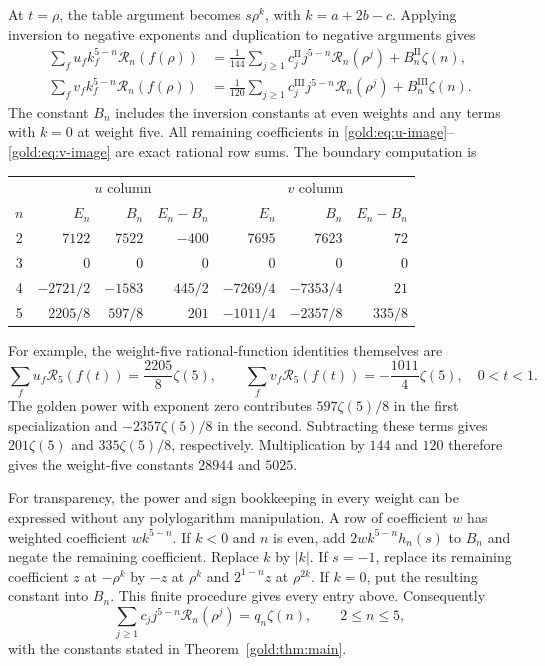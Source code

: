 At $t=\rho$, the table argument becomes $s\rho^k$, with
$k=a+2b-c$.  Applying inversion to negative exponents and duplication
to negative arguments gives
\begin{align}
 \sum_f u_f k_f^{5-n}\mathcal R_n(f(\rho))
 &=\frac1{144}\sum_{j\ge1}c^{\mathrm{II}}_j
           j^{5-n}\mathcal R_n(\rho^j)
      +B_n^{\mathrm{II}}\zeta(n),
 \label{gold:eq:u-image}\\
 \sum_f v_f k_f^{5-n}\mathcal R_n(f(\rho))
 &=\frac1{120}\sum_{j\ge1}c^{\mathrm{III}}_j
           j^{5-n}\mathcal R_n(\rho^j)
      +B_n^{\mathrm{III}}\zeta(n).
 \label{gold:eq:v-image}
\end{align}
The constant $B_n$ includes the inversion constants at even weights
and any terms with $k=0$ at weight five.  All remaining coefficients
in \eqref{gold:eq:u-image}--\eqref{gold:eq:v-image} are exact rational
row sums.  The boundary computation is
\begin{center}
\small
\begin{tabular}{c|rrr|rrr}
 &\multicolumn{3}{c|}{$u$ column}&\multicolumn{3}{c}{$v$ column}\\
$n$&$E_n$&$B_n$&$E_n-B_n$&$E_n$&$B_n$&$E_n-B_n$\\ \hline
2&$7122$&$7522$&$-400$&$7695$&$7623$&$72$\\
3&$0$&$0$&$0$&$0$&$0$&$0$\\
4&$-2721/2$&$-1583$&$445/2$&$-7269/4$&$-7353/4$&$21$\\
5&$2205/8$&$597/8$&$201$&$-1011/4$&$-2357/8$&$335/8$
\end{tabular}
\end{center}
For example, the weight-five rational-function identities themselves are
\begin{equation}
 \sum_f u_f\mathcal R_5(f(t))=\frac{2205}{8}\zeta(5),\qquad
 \sum_f v_f\mathcal R_5(f(t))=-\frac{1011}{4}\zeta(5),
 \quad 0<t<1.
 \label{gold:eq:new-functional-identities}
\end{equation}
The golden power with exponent zero contributes $597\zeta(5)/8$ in
the first specialization and $-2357\zeta(5)/8$ in the second.
Subtracting these terms gives $201\zeta(5)$ and
$335\zeta(5)/8$, respectively.  Multiplication by $144$ and $120$
therefore gives the weight-five constants $28944$ and $5025$.

For transparency, the power and sign bookkeeping in every weight can
be expressed without any polylogarithm manipulation.  A row of
coefficient $w$ has weighted coefficient $w k^{5-n}$.  If $k<0$ and
$n$ is even, add $2wk^{5-n}h_n(s)$ to $B_n$ and negate the remaining
coefficient.  Replace $k$ by $|k|$.  If $s=-1$, replace its remaining
coefficient $z$ at $-\rho^k$ by $-z$ at $\rho^k$ and
$2^{1-n}z$ at $\rho^{2k}$.  If $k=0$, put the resulting constant into
$B_n$.  This finite procedure gives every entry above.
Consequently
\begin{equation}
 \sum_{j\ge1}c_jj^{5-n}\mathcal R_n(\rho^j)=q_n\zeta(n),
 \qquad 2\le n\le5,
 \label{gold:eq:golden-R}
\end{equation}
with the constants stated in Theorem~\ref{gold:thm:main}.

